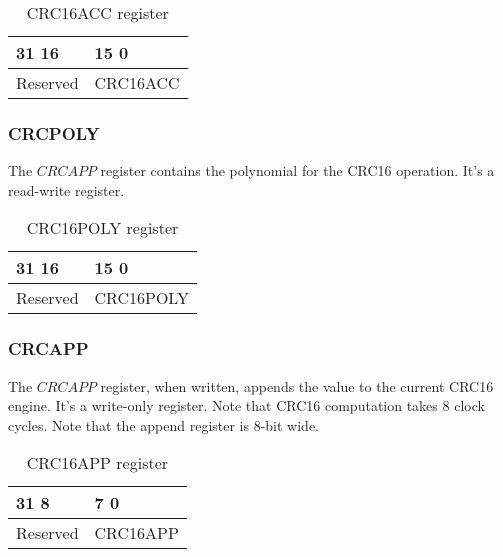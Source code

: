 \begin{table}[H]
\begin{center}
\begin{tabularx}{14cm}{XX}
31 \hfill 16 & 15 \hfill 0 \\

\hline
\multicolumn{1}{|c|}{Reserved} & 
\multicolumn{1}{|c|}{CRC16ACC}  \\

\hline
\end{tabularx}
\caption{CRC16ACC register}
\end{center}
\end{table}

\subsubsection{CRCPOLY}
The $CRCAPP$ register contains the polynomial for the CRC16 operation. It's a read-write register.

\begin{table}[H]
\begin{center}
\begin{tabularx}{14cm}{XX}
31 \hfill 16 & 15 \hfill 0 \\

\hline
\multicolumn{1}{|c|}{Reserved} & 
\multicolumn{1}{|c|}{CRC16POLY}  \\

\hline
\end{tabularx}
\caption{CRC16POLY register}
\end{center}
\end{table}

\subsubsection{CRCAPP}
The $CRCAPP$ register, when written, appends the value to the current CRC16 engine. It's a write-only register.
Note that CRC16 computation takes 8 clock cycles. Note that the append register is 8-bit wide.

\begin{table}[H]
\begin{center}
\begin{tabularx}{14cm}{XX}
31 \hfill 8 & 7 \hfill 0 \\

\hline
\multicolumn{1}{|c|}{Reserved} & 
\multicolumn{1}{|c|}{CRC16APP}  \\

\hline
\end{tabularx}
\caption{CRC16APP register}
\end{center}
\end{table}


